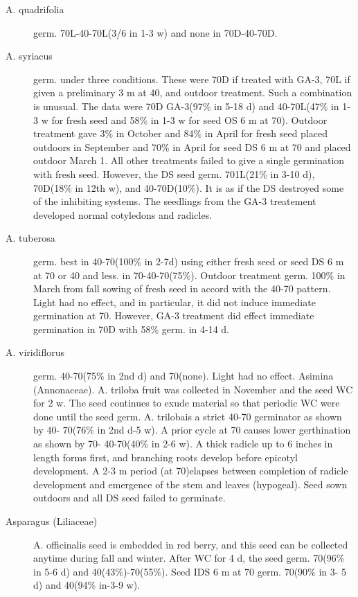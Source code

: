 \begin{description}
\item[A. quadrifolia] germ. 70L-40-70L(3/6 in 1-3 w) and none in 70D-40-70D.
\item[A. syriacus] germ. under three conditions. These were 70D if treated with GA-3,
70L if given a preliminary 3 m at 40, and outdoor treatment. Such a combination is
unusual. The data were 70D GA-3(97\% in 5-18 d) and 40-70L(47\% in 1-3 w for fresh
seed and 58\% in 1-3 w for seed OS 6 m at 70). Outdoor treatment gave 3\% in October
and 84\% in April for fresh seed placed outdoors in September and 70\% in April for
seed DS 6 m at 70 and placed outdoor March 1. All other treatments failed to give a
single germination with fresh seed. However, the DS seed germ. 701L(21\% in 3-10 d),
70D(18\% in 12th w), and 40-70D(10\%). It is as if the DS destroyed some of the
inhibiting systems. The seedlings from the GA-3 treatement developed normal
cotyledons and radicles.

\item[A. tuberosa] germ. best in 40-70(100\% in 2-7d) using either fresh seed or seed
DS 6 m at 70 or 40 and less. in 70-40-70(75\%). Outdoor treatment germ. 100\% in
March from fall sowing of fresh seed in accord with the 40-70 pattern. Light had no
effect, and in particular, it did not induce immediate germination at 70. However, GA-3
treatment did effect immediate germination in 70D with 58\% germ. in 4-14 d.

\item[A. viridiflorus] germ. 40-70(75\% in 2nd d) and 70(none). Light had no effect.
Asimina (Annonaceae). A. triloba fruit was collected in November and the
seed WC for 2 w. The seed continues to exude material so that periodic WC were
done until the seed germ. A. trilobais a strict 40-70 germinator as shown by 40-
70(76\% in 2nd d-5 w). A prior cycle at 70 causes lower gerthination as shown by 70-
40-70(40\% in 2-6 w). A thick radicle up to 6 inches in length forms first, and branching
roots develop before epicotyl development. A 2-3 m period (at 70)elapses between
completion of radicle development and emergence of the stem and leaves (hypogeal).
Seed sown outdoors and all DS seed failed to germinate.

\item[Asparagus (Liliaceae)] A. officinalis seed is embedded in red berry, and
this seed can be collected anytime during fall and winter. After WC for 4 d, the seed
germ. 70(96\% in 5-6 d) and 40(43\%)-70(55\%). Seed IDS 6 m at 70 germ. 70(90\% in 3-
5 d) and 40(94\% in-3-9 w).


\end{description}
